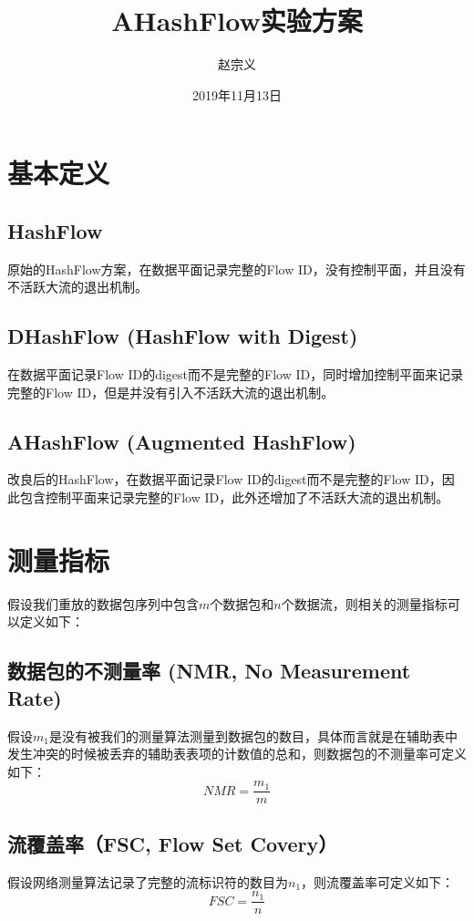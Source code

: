 \documentclass{article}
\title{AHashFlow实验方案}
\author{赵宗义}
\date{2019年11月13日}
\begin{document}
\maketitle

\tableofcontents

\section{基本定义}
\subsection{HashFlow}
原始的HashFlow方案，在数据平面记录完整的Flow ID，没有控制平面，并且没有不活跃大流的退出机制。

\subsection{DHashFlow (HashFlow with Digest)}
在数据平面记录Flow ID的digest而不是完整的Flow ID，同时增加控制平面来记录完整的Flow ID，但是并没有引入不活跃大流的退出机制。

\subsection{AHashFlow (Augmented HashFlow)}
改良后的HashFlow，在数据平面记录Flow ID的digest而不是完整的Flow ID，因此包含控制平面来记录完整的Flow ID，此外还增加了不活跃大流的退出机制。

\section{测量指标}
假设我们重放的数据包序列中包含$m$个数据包和$n$个数据流，则相关的测量指标可以定义如下：

\subsection{数据包的不测量率  (NMR, No Measurement Rate)}
假设$m_1$是没有被我们的测量算法测量到数据包的数目，具体而言就是在辅助表中发生冲突的时候被丢弃的辅助表表项的计数值的总和，则数据包的不测量率可定义如下：
$$
NMR = \frac{m_1}{m}
$$

\subsection{ 流覆盖率（FSC, Flow Set Covery）}
假设网络测量算法记录了完整的流标识符的数目为$n_1$，则流覆盖率可定义如下：
$$
FSC = \frac{n_1}{n}
$$
\end{document}
